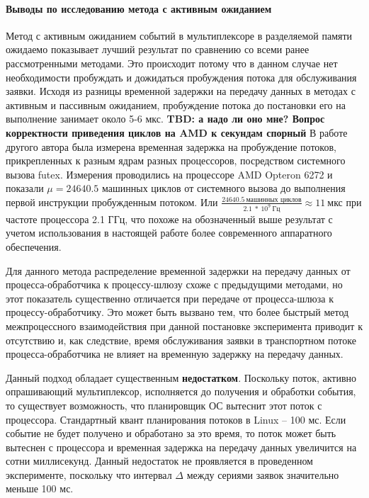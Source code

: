 \paragraph{Выводы по исследованию метода с активным ожиданием}
Метод с активным ожиданием событий в мультиплексоре в разделяемой памяти ожидаемо показывает лучший результат по сравнению со всеми ранее рассмотренными методами. Это происходит потому что в данном случае нет необходимости пробуждать и дожидаться пробуждения потока для обслуживания заявки. Исходя из разницы временной задержки на передачу данных в методах с активным и пассивным ожиданием, пробуждение потока до постановки его на выполнение занимает около 5-6 мкс.
\textbf{TBD: а надо ли оно мне? Вопрос корректности приведения циклов на AMD к секундам спорный}
В работе другого автора \cite{8526899} была измерена временная задержка на пробуждение потоков, прикрепленных к разным ядрам разных процессоров, посредством системного вызова futex. Измерения проводились на процессоре AMD Opteron 6272 и показали $\mu = 24640.5$ машинных циклов от системного вызова до выполнения первой инструкции пробужденным потоком. Или $\frac{24640.5~\text{машинных~циклов}}{2.1~*~10^9~\text{Гц}} \approx 11 ~\text{мкс}$ при частоте процессора 2.1 ГГц, что похоже на обозначенный выше результат с учетом использования в настоящей работе более современного аппаратного обеспечения.

Для данного метода распределение временной задержки на передачу данных от процесса-обработчика к процессу-шлюзу схоже с предыдущими методами, но этот показатель существенно отличается при передаче от процесса-шлюза к процессу-обработчику. Это может быть вызвано тем, что более быстрый метод межпроцессного взаимодействия при данной постановке эксперимента приводит к отсутствию и, как следствие, время обслуживания заявки в транспортном потоке процесса-обработчика не влияет на временную задержку на передачу данных.

Данный подход обладает существенным \textbf{недостатком}. Поскольку поток, активно опрашивающий мультиплексор, исполняется до получения и обработки события, то существует возможность, что планировщик ОС вытеснит этот поток с процессора. Стандартный квант планирования потоков в Linux -- 100 мс. Если событие не будет получено и обработано за это время, то поток может быть вытеснен с процессора и временная задержка на передачу данных увеличится на сотни миллисекунд. Данный недостаток не проявляется в проведенном эксперименте, поскольку что интервал $\Delta$ между сериями заявок значительно меньше 100 мс.
